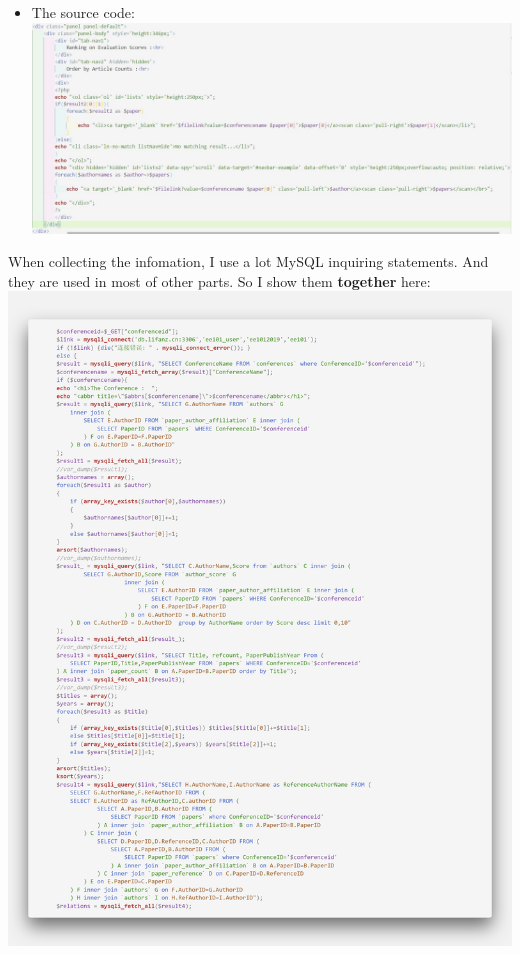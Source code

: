\documentclass{article}
\begin{document}
\begin{itemize}
		\item The source code:\\\includegraphics[width=\textwidth]{authorcode1.jpg}\\
	\end{itemize}
	
	\large When collecting the infomation, I use a lot MySQL inquiring statements. And they are used in most of other parts. So I show them {\bfseries together} here:\\
	\includegraphics[width=\textwidth]{code0.png}
\end{document}

